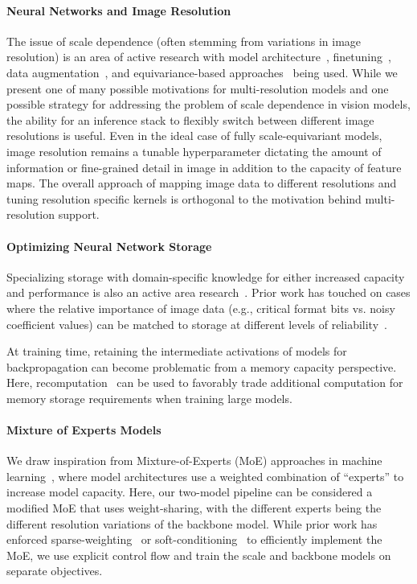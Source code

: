 \paragraph{Neural Networks and Image Resolution}
The issue of scale dependence (often stemming from variations in image resolution) is an area of active research with model architecture~\cite{DBLP:journals/corr/KanazawaSJ14}, finetuning~\cite{touvron2019fixing}, data augmentation~\cite{hoffer2019mix}, and equivariance-based approaches~\cite{sosnovik2019scaleequivariant} being used.
While we present one of many possible motivations for multi-resolution models and one possible strategy for addressing the problem of scale dependence in vision models, the ability for an inference stack to flexibly switch between different image resolutions is useful.
Even in the ideal case of fully scale-equivariant models, image resolution remains a tunable hyperparameter dictating the amount of information or fine-grained detail in image in addition to the capacity of feature maps.
The overall approach of mapping image data to different resolutions and tuning resolution specific kernels is orthogonal to the motivation behind multi-resolution support.

\paragraph{Optimizing Neural Network Storage}
Specializing storage with domain-specific knowledge for either increased capacity and performance is also an active area research~\cite{sampson2014approximate, jevdjic2017approximate, mazumdar2019vignette}.
Prior work has touched on cases where the relative importance of image data (e.g., critical format bits vs. noisy coefficient values) can be matched to storage at different levels of reliability~\cite{guo2016high, jevdjic2017approximate}.

At training time, retaining the intermediate activations of models for backpropagation can become problematic from a memory capacity perspective.
Here, recomputation~\cite{chen2016xgboost, kirisame2020dynamic} can be used to favorably trade additional computation for memory storage requirements when training large models.

\paragraph{Mixture of Experts Models}
We draw inspiration from Mixture-of-Experts (MoE) approaches in machine learning~\cite{jacobs1991adaptive, shazeer2017outrageously, yang2019soft, lepikhin2020gshard}, where model architectures use a weighted combination of ``experts'' to increase model capacity.
Here, our two-model pipeline can be considered a modified MoE that uses weight-sharing, with the different experts being the different resolution variations of the backbone model.
While prior work has enforced sparse-weighting~\cite{shazeer2017outrageously} or soft-conditioning~\cite{yang2019soft} to efficiently implement the MoE, we use explicit control flow and train the scale and backbone models on separate objectives.


